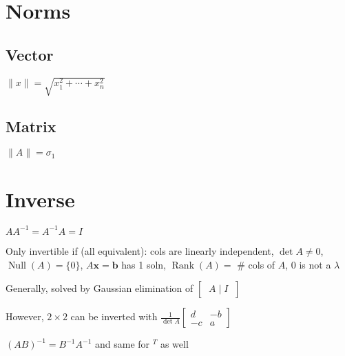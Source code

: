 \documentclass[10pt,letterpaper]{article}
\newenvironment{tight_item}
{\begin{itemize}
\setlength{\parskip}{0pt}
\setlength{\parsep}{0pt}
\setlength{\itemsep}{0pt}
\setlength{\parsep}{0pt}
\setlength{\topsep}{0pt}
\setlength{\partopsep}{0pt}
\setlength{\leftmargin}{0em}
\setlength{\labelwidth}{0em}
\setlength{\labelsep}{0em} }
{\end{itemize}}
\begin{document}
\footnotesize{

\begin{multicols*}{5}

\section{Norms}
\subsection{Vector}
\begin{center}
$\|x\| = \sqrt{x_1^2 + \cdots + x_n^2}$
\end{center}
\subsection{Matrix}
\begin{center}
$\|A\| = \sigma_{1}$
\end{center}

\section{Inverse}
\begin{center}
$AA^{-1} = A^{-1}A = I$
\end{center}
\begin{tight_item}
\item Only invertible if (all equivalent): cols are linearly independent,
$\det{A} \neq 0$, $\operatorname{Null}(A)= \{0\}$, $A \textbf{x} =
\textbf{b}$ has 1 soln, $\operatorname{Rank}(A) =$ \# cols of $A$, 0 is not a
$\lambda$
\item Generally, solved by Gaussian elimination of $\begin{bmatrix}\: A \; | \; I \: \end{bmatrix}$
\item However, $2 \times 2$ can be inverted with
$\frac{1}{\det{A}}\begin{bmatrix}d & -b\\-c & a \end{bmatrix}$
\item $(AB)^{-1} = B^{-1}A^{-1}$ and same for $^{T}$ as well
\end{tight_item}


\end{multicols*}}
\end{document}
